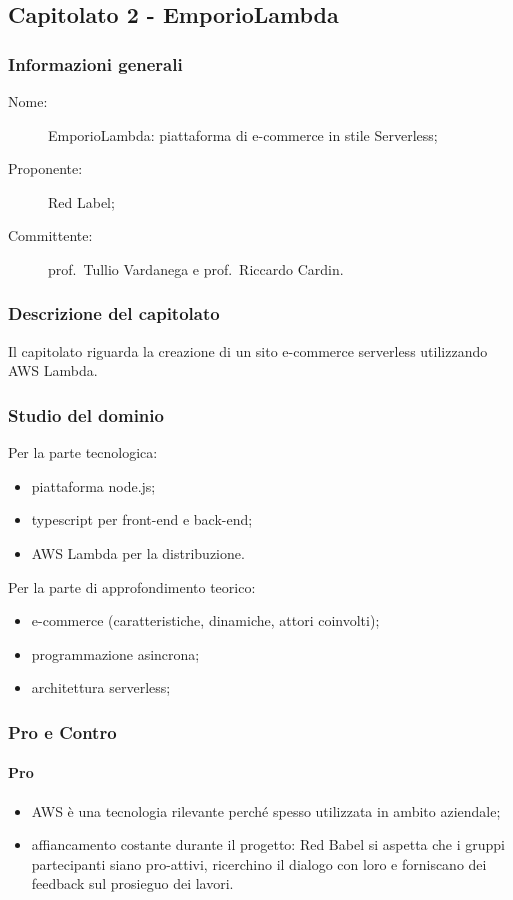 \subsection{Capitolato 2 - EmporioLambda}
\subsubsection{Informazioni generali}
\begin{description}
	\item[Nome:] EmporioLambda: piattaforma di e-commerce in stile Serverless;
	\item[Proponente:] Red Label;
	\item[Committente:] prof.~Tullio Vardanega e prof.~Riccardo Cardin.
\end{description}
\subsubsection{Descrizione del capitolato}
Il capitolato riguarda la creazione di un sito e-commerce serverless utilizzando AWS Lambda.
\subsubsection{Studio del dominio}
Per la parte tecnologica:
\begin{itemize}
	\item piattaforma node.js;
	\item typescript per front-end e back-end;
	\item AWS Lambda per la distribuzione.
\end{itemize}
Per la parte di approfondimento teorico:
\begin{itemize}
	\item e-commerce (caratteristiche, dinamiche, attori coinvolti);
	\item programmazione asincrona;
	\item architettura serverless;
\end{itemize}
\subsubsection{Pro e Contro}
\paragraph*{Pro}
\begin{itemize}
	\item AWS è una tecnologia rilevante perché spesso utilizzata in ambito aziendale;
	\item affiancamento costante durante il progetto: Red Babel si aspetta che i gruppi partecipanti siano pro-attivi, ricerchino il dialogo con loro e forniscano dei feedback sul prosieguo dei lavori.
\end{itemize}

